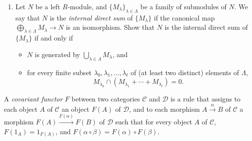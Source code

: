 \documentclass{amsart}[12pt]
\def\sC{\mathscr C}
\def\sD{\mathscr  D}
\numberwithin{equation}{section}
\theoremstyle{plain} %
\theoremstyle{definition}
\theoremstyle{remark}
\newcommand{\xra}[1]{\xrightarrow{#1}}
\begin{document}
\begin{enumerate}
\

\item Let $N$ be a left $R$-module, and $\{M_\lambda\}_{\lambda\in \Lambda}$ be a family of submodules of $N$.
We say that $N$ is the \emph{internal direct sum} of $\{M_\lambda\}$ if the canonical map $\bigoplus_{\lambda\in\Lambda} M_{\lambda} \to N$ is an isomorphism. Show that $N$ is the internal direct sum of $\{M_\lambda\}$ if and only if
\begin{itemize}
\item $N$ is generated by $\bigcup_{\lambda\in \Lambda} M_\lambda$, and
\item for every finite subset $\lambda_0,\lambda_1,\dots,\lambda_t$ of (at least two distinct) elements of $\Lambda$,
\[ M_{\lambda_0} \cap (M_{\lambda_1} + \cdots + M_{\lambda_t}) = 0.\]
\end{itemize}
\end{enumerate}


\noindent A \emph{covariant functor} $F$ between two categories $\sC$ and $\sD$ is a rule that assigns
to each object $A$ of $\sC$ an object $F(A)$ of $\sD$, and to each morphism $A\xra{\alpha}B$ of $\sC$ a morphism $F(A) \xra{F(\alpha)} F(B)$ of $\sD$ such that for every object $A$ of $\sC$, $F(1_A) = 1_{F(A)}$, and $F(\alpha\circ \beta) = F(\alpha)\circ F(\beta)$.

\
\end{document}
